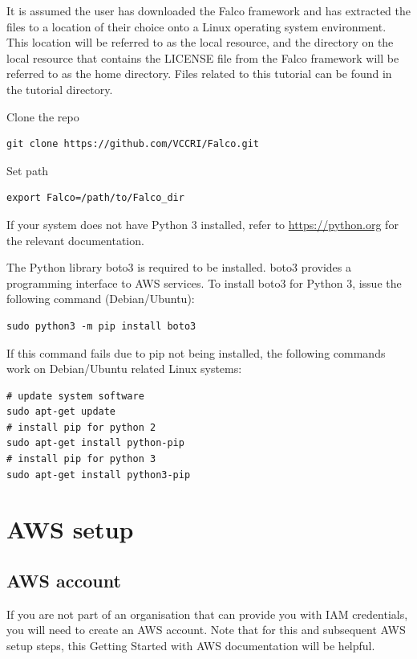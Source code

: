 \documentclass[
]{book}
\begin{document}
It is assumed the user has downloaded the Falco framework and has extracted the files to a location of their choice onto a Linux operating system environment. This location will be referred to as the local resource, and the directory on the local resource that contains the LICENSE file from the Falco framework will be referred to as the home directory. Files related to this tutorial can be found in the tutorial directory.

Clone the repo

\begin{verbatim}
git clone https://github.com/VCCRI/Falco.git
\end{verbatim}

Set path

\begin{verbatim}
export Falco=/path/to/Falco_dir
\end{verbatim}

If your system does not have Python 3 installed, refer to \url{https://python.org} for the relevant documentation.

The Python library boto3 is required to be installed. boto3 provides a programming interface to AWS services. To install boto3 for Python 3, issue the following command (Debian/Ubuntu):

\begin{verbatim}
sudo python3 -m pip install boto3
\end{verbatim}

If this command fails due to pip not being installed, the following commands work on Debian/Ubuntu related Linux systems:

\begin{verbatim}
# update system software
sudo apt-get update
# install pip for python 2
sudo apt-get install python-pip
# install pip for python 3
sudo apt-get install python3-pip
\end{verbatim}

\hypertarget{aws-setup}{%
\section{AWS setup}\label{aws-setup}}

\hypertarget{aws-account}{%
\subsection{AWS account}\label{aws-account}}

If you are not part of an organisation that can provide you with IAM credentials, you will need to create an AWS account. Note that for this and subsequent AWS setup steps, this Getting Started with AWS documentation will be helpful.
\end{document}
